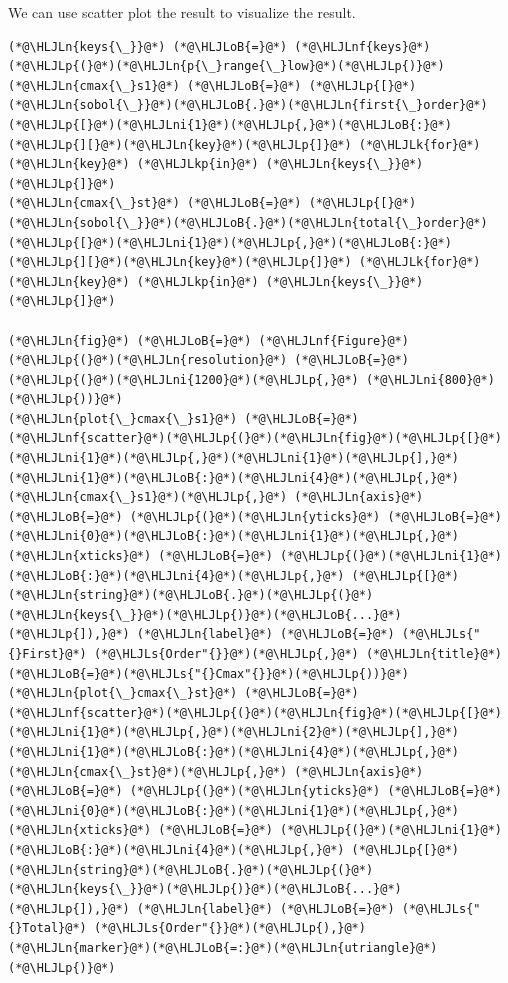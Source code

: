 \documentclass[12pt,a4paper]{article}
\newcommand{\HLJLk}[1]{\textcolor[RGB]{148,91,176}{\textbf{#1}}}
\newcommand{\HLJLkp}[1]{\textcolor[RGB]{148,91,176}{\textbf{#1}}}
\newcommand{\HLJLn}[1]{#1}
\newcommand{\HLJLnf}[1]{\textcolor[RGB]{66,102,213}{#1}}
\newcommand{\HLJLs}[1]{\textcolor[RGB]{201,61,57}{#1}}
\newcommand{\HLJLni}[1]{\textcolor[RGB]{59,151,46}{#1}}
\newcommand{\HLJLoB}[1]{\textcolor[RGB]{102,102,102}{\textbf{#1}}}
\newcommand{\HLJLp}[1]{#1}
\begin{document}
We can use scatter plot the result to visualize the result.


\begin{lstlisting}
(*@\HLJLn{keys{\_}}@*) (*@\HLJLoB{=}@*) (*@\HLJLnf{keys}@*)(*@\HLJLp{(}@*)(*@\HLJLn{p{\_}range{\_}low}@*)(*@\HLJLp{)}@*)
(*@\HLJLn{cmax{\_}s1}@*) (*@\HLJLoB{=}@*) (*@\HLJLp{[}@*)(*@\HLJLn{sobol{\_}}@*)(*@\HLJLoB{.}@*)(*@\HLJLn{first{\_}order}@*)(*@\HLJLp{[}@*)(*@\HLJLni{1}@*)(*@\HLJLp{,}@*)(*@\HLJLoB{:}@*)(*@\HLJLp{][}@*)(*@\HLJLn{key}@*)(*@\HLJLp{]}@*) (*@\HLJLk{for}@*) (*@\HLJLn{key}@*) (*@\HLJLkp{in}@*) (*@\HLJLn{keys{\_}}@*)(*@\HLJLp{]}@*)
(*@\HLJLn{cmax{\_}st}@*) (*@\HLJLoB{=}@*) (*@\HLJLp{[}@*)(*@\HLJLn{sobol{\_}}@*)(*@\HLJLoB{.}@*)(*@\HLJLn{total{\_}order}@*)(*@\HLJLp{[}@*)(*@\HLJLni{1}@*)(*@\HLJLp{,}@*)(*@\HLJLoB{:}@*)(*@\HLJLp{][}@*)(*@\HLJLn{key}@*)(*@\HLJLp{]}@*) (*@\HLJLk{for}@*) (*@\HLJLn{key}@*) (*@\HLJLkp{in}@*) (*@\HLJLn{keys{\_}}@*)(*@\HLJLp{]}@*)

(*@\HLJLn{fig}@*) (*@\HLJLoB{=}@*) (*@\HLJLnf{Figure}@*)(*@\HLJLp{(}@*)(*@\HLJLn{resolution}@*) (*@\HLJLoB{=}@*) (*@\HLJLp{(}@*)(*@\HLJLni{1200}@*)(*@\HLJLp{,}@*) (*@\HLJLni{800}@*)(*@\HLJLp{))}@*)
(*@\HLJLn{plot{\_}cmax{\_}s1}@*) (*@\HLJLoB{=}@*) (*@\HLJLnf{scatter}@*)(*@\HLJLp{(}@*)(*@\HLJLn{fig}@*)(*@\HLJLp{[}@*)(*@\HLJLni{1}@*)(*@\HLJLp{,}@*)(*@\HLJLni{1}@*)(*@\HLJLp{],}@*) (*@\HLJLni{1}@*)(*@\HLJLoB{:}@*)(*@\HLJLni{4}@*)(*@\HLJLp{,}@*) (*@\HLJLn{cmax{\_}s1}@*)(*@\HLJLp{,}@*) (*@\HLJLn{axis}@*) (*@\HLJLoB{=}@*) (*@\HLJLp{(}@*)(*@\HLJLn{yticks}@*) (*@\HLJLoB{=}@*) (*@\HLJLni{0}@*)(*@\HLJLoB{:}@*)(*@\HLJLni{1}@*)(*@\HLJLp{,}@*) (*@\HLJLn{xticks}@*) (*@\HLJLoB{=}@*) (*@\HLJLp{(}@*)(*@\HLJLni{1}@*)(*@\HLJLoB{:}@*)(*@\HLJLni{4}@*)(*@\HLJLp{,}@*) (*@\HLJLp{[}@*)(*@\HLJLn{string}@*)(*@\HLJLoB{.}@*)(*@\HLJLp{(}@*)(*@\HLJLn{keys{\_}}@*)(*@\HLJLp{)}@*)(*@\HLJLoB{...}@*)(*@\HLJLp{]),}@*) (*@\HLJLn{label}@*) (*@\HLJLoB{=}@*) (*@\HLJLs{"{}First}@*) (*@\HLJLs{Order"{}}@*)(*@\HLJLp{,}@*) (*@\HLJLn{title}@*)(*@\HLJLoB{=}@*)(*@\HLJLs{"{}Cmax"{}}@*)(*@\HLJLp{))}@*)
(*@\HLJLn{plot{\_}cmax{\_}st}@*) (*@\HLJLoB{=}@*) (*@\HLJLnf{scatter}@*)(*@\HLJLp{(}@*)(*@\HLJLn{fig}@*)(*@\HLJLp{[}@*)(*@\HLJLni{1}@*)(*@\HLJLp{,}@*)(*@\HLJLni{2}@*)(*@\HLJLp{],}@*) (*@\HLJLni{1}@*)(*@\HLJLoB{:}@*)(*@\HLJLni{4}@*)(*@\HLJLp{,}@*) (*@\HLJLn{cmax{\_}st}@*)(*@\HLJLp{,}@*) (*@\HLJLn{axis}@*) (*@\HLJLoB{=}@*) (*@\HLJLp{(}@*)(*@\HLJLn{yticks}@*) (*@\HLJLoB{=}@*) (*@\HLJLni{0}@*)(*@\HLJLoB{:}@*)(*@\HLJLni{1}@*)(*@\HLJLp{,}@*) (*@\HLJLn{xticks}@*) (*@\HLJLoB{=}@*) (*@\HLJLp{(}@*)(*@\HLJLni{1}@*)(*@\HLJLoB{:}@*)(*@\HLJLni{4}@*)(*@\HLJLp{,}@*) (*@\HLJLp{[}@*)(*@\HLJLn{string}@*)(*@\HLJLoB{.}@*)(*@\HLJLp{(}@*)(*@\HLJLn{keys{\_}}@*)(*@\HLJLp{)}@*)(*@\HLJLoB{...}@*)(*@\HLJLp{]),}@*) (*@\HLJLn{label}@*) (*@\HLJLoB{=}@*) (*@\HLJLs{"{}Total}@*) (*@\HLJLs{Order"{}}@*)(*@\HLJLp{),}@*) (*@\HLJLn{marker}@*)(*@\HLJLoB{=:}@*)(*@\HLJLn{utriangle}@*)(*@\HLJLp{)}@*)


\end{lstlisting}
\end{document}
